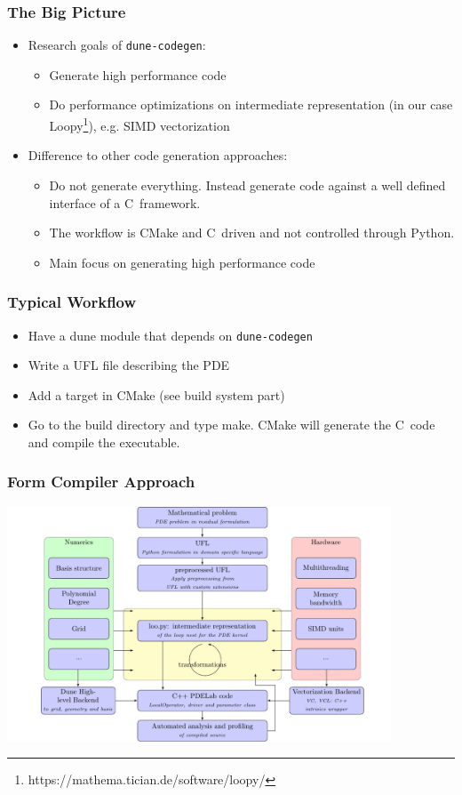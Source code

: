 \documentclass[aspectratio=169,11pt]{beamer}
\theoremstyle{definition}
\def\CC{{C\nolinebreak[4]\hspace{-.05em}\raisebox{.4ex}{\tiny\bf ++}}}
\begin{document}
\begin{frame}[fragile]
  \frametitle{The Big Picture}
  \begin{itemize}
  \item Research goals of \lstinline{dune-codegen}:
    \begin{itemize}
    \item Generate high performance code
    \item Do performance optimizations on intermediate representation (in our
      case Loopy\footnote{https://mathema.tician.de/software/loopy/}),
      e.g. SIMD vectorization
    \end{itemize}
  \item Difference to other code generation approaches:
    \begin{itemize}
    \item Do not generate everything. Instead generate code against a well
      defined interface of a \CC\ framework.
    \item The workflow is CMake and \CC\ driven and not controlled through
      Python.
    \item Main focus on generating high performance code
    \end{itemize}
  \end{itemize}
\end{frame}

\begin{frame}
  \frametitle{Typical Workflow}
  \begin{itemize}
  \item Have a dune module that depends on \lstinline{dune-codegen}
  \item Write a UFL file describing the PDE
  \item Add a target in CMake (see build system part)
  \item Go to the build directory and type make. CMake will generate the \CC\
    code and compile the executable.
  \end{itemize}
\end{frame}

\begin{frame}
 \frametitle{Form Compiler Approach}
 \centering
 \includegraphics[width=4.5in]{./figures/approach.pdf}
\end{frame}
\end{document}
